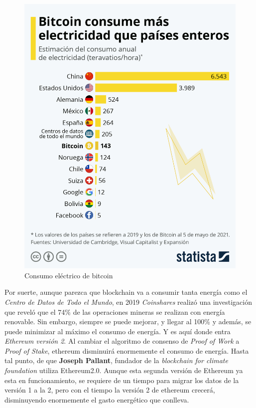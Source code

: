 \begin{figure}[h!]
  \centering
  \includegraphics[width=0.6\linewidth]{figs/ImpactoMedioAmbiente/electricidad_bitcoin}
  \caption[Consumo eléctrico de bitcoin]{Consumo eléctrico de bitcoin}
  \label{fig:electricidad_bitcoin}
\end{figure}

Por suerte, aunque parezca que blockchain va a consumir tanta energía como el \textit{Centro de Datos de Todo el Mundo}, en 2019 \emph{Coinshares} realizó una investigación\cite{coinshare} que reveló que el 74\% de las operaciones mineras se realizan con energía renovable. Sin embargo, siempre se puede mejorar, y llegar al 100\% y además, se puede minimizar al máximo el consumo de energía. Y es aquí donde entra \emph{Ethereum versión 2}\cite{Ethereum2.0}. Al cambiar el algoritmo de consenso de \textit{Proof of Work} a \textit{Proof of Stake}, ethereum disminuirá enormemente el consumo de energía. Hasta tal punto, de que \textbf{Joseph Pallant}, fundador de la \emph{blockchain for climate foundation}\cite{bkClimateF} utiliza Ethereum2.0. Aunque esta segunda versión de Ethereum ya esta en funcionamiento, se requiere de un tiempo para migrar los datos de la versión 1 a la 2, pero con el tiempo la versión 2 de ethereum crecerá, disminuyendo enormemente el gasto energético que conlleva. \\

